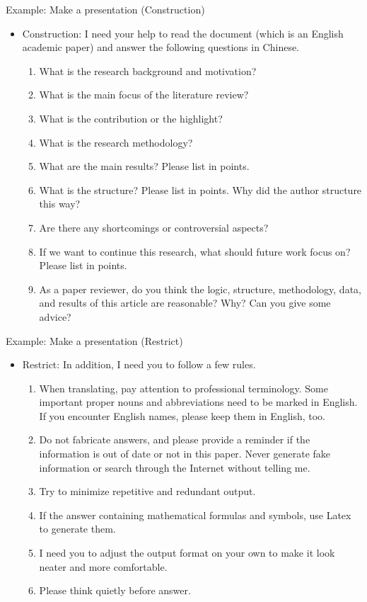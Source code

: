 \documentclass[UTF8, 16pt]{beamer}
\begin{document}
\begin{CJK*}{UTF8}{gbsn}
\begin{frame}{Example: Make a presentation (Construction)}
\begin{itemize}
		\item \alert{Construction}: I need your help to read the document (which is an English academic paper) and answer the following questions in Chinese.
			\begin{enumerate}
				\item What is the research background and motivation?
				\item What is the main focus of the literature review? 
				\item What is the contribution or the highlight?
				\item What is the research methodology?
				\item What are the main results? Please list in points.
				\item What is the structure? Please list in points. Why did the author structure this way?
				\item Are there any shortcomings or controversial aspects?
				\item If we want to continue this research, what should future work focus on? Please list in points.
				\item As a paper reviewer, do you think the logic, structure, methodology, data, and results of this article are reasonable? Why? Can you give some advice?
			\end{enumerate}
	\end{itemize}
\end{frame}
\begin{frame}{Example: Make a presentation (Restrict)}
	\begin{itemize}
		\item \alert{Restrict}: In addition, I need you to follow a few rules.
			\begin{enumerate}
				\item When translating, pay attention to professional terminology. Some important proper nouns and abbreviations need to be marked in English. If you encounter English names, please keep them in English, too.
				\item Do not fabricate answers, and please provide a reminder if the information is out of date or not in this paper. Never generate fake information or search through the Internet without telling me.
				\item Try to minimize repetitive and redundant output.
				\item If the answer containing mathematical formulas and symbols, use Latex to generate them.
				\item I need you to adjust the output format on your own to make it look neater and more comfortable. 
				\item Please think quietly before answer.
			\end{enumerate}
	\end{itemize}
\end{frame}


\end{CJK*}
\end{document}
